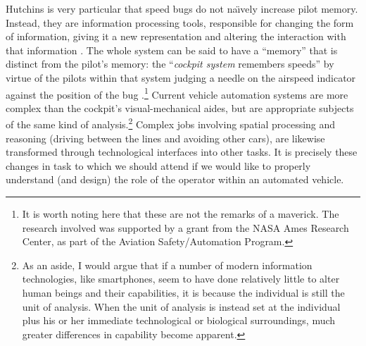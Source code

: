 

Hutchins is very particular that speed bugs do not na\"{\i}vely
increase pilot memory. Instead, they 
are information processing tools, responsible for changing the form of
information, giving it a new representation and altering the
interaction with that information \cite[p. 282]{hutchinsCockpit}. The whole system can be said to
have a ``memory'' that is distinct from the pilot's memory: the
``\emph{cockpit system} remembers speeds'' by virtue of the pilots
within that system judging a needle on the airspeed indicator against
the position of the bug \cite[p.
  283]{hutchinsCockpit}.\footnote{It is 
  worth noting here that these are not the remarks of a maverick. The research involved
  was supported by a grant from the NASA Ames Research Center, as part
  of the Aviation Safety/Automation Program.}
Current vehicle automation systems are more complex than the cockpit's
visual-mechanical aides, but are appropriate subjects of the same kind
of analysis.\footnote{As an aside, I would argue that if a number of
  modern information technologies, like smartphones, seem to have done
relatively little to alter human beings and their capabilities, it is
because the individual 
is still the unit of analysis. When the unit of analysis is instead
set at the individual plus his or her immediate technological or biological
surroundings, much greater differences in capability become apparent.}
Complex jobs involving spatial
processing and reasoning (driving between the lines and avoiding other
cars), are likewise transformed through technological interfaces into other
tasks. It is precisely these changes in task to which we should attend
if we would like to properly understand (and design) the role of the
operator within an automated vehicle. 



